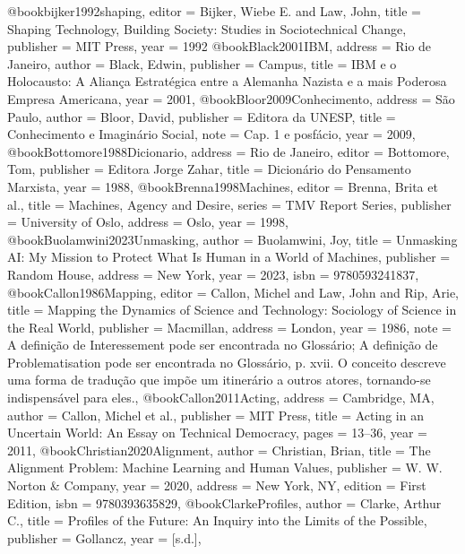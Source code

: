 @book{bijker1992shaping,
  editor    = {Bijker, Wiebe E. and Law, John},
  title     = {Shaping Technology, Building Society: Studies in Sociotechnical Change},
  publisher = {MIT Press},
  year      = {1992}
}
@book{Black2001IBM,
  address   = {Rio de Janeiro},
  author    = {Black, Edwin},
  publisher = {Campus},
  title     = {{IBM e o Holocausto: A Aliança Estratégica entre a Alemanha Nazista e a mais Poderosa Empresa Americana}},
  year      = {2001},
}
@book{Bloor2009Conhecimento,
  address   = {São Paulo},
  author    = {Bloor, David},
  publisher = {Editora da UNESP},
  title     = {{Conhecimento e Imaginário Social}},
  note      = {Cap. 1 e posfácio},
  year      = {2009},
}
@book{Bottomore1988Dicionario,
  address   = {Rio de Janeiro},
  editor    = {Bottomore, Tom},
  publisher = {Editora Jorge Zahar},
  title     = {{Dicionário do Pensamento Marxista}},
  year      = {1988},
}
@book{Brenna1998Machines,
  editor    = {Brenna, Brita et al.},
  title     = {{Machines, Agency and Desire}},
  series    = {{TMV Report Series}},
  publisher = {University of Oslo},
  address   = {Oslo},
  year      = {1998},
}
@book{Buolamwini2023Unmasking,
  author    = {Buolamwini, Joy},
  title     = {{Unmasking AI: My Mission to Protect What Is Human in a World of Machines}},
  publisher = {Random House},
  address   = {New York},
  year      = {2023},
  isbn      = {9780593241837},
}
@book{Callon1986Mapping,
  editor    = {Callon, Michel and Law, John and Rip, Arie},
  title     = {{Mapping the Dynamics of Science and Technology: Sociology of Science in the Real World}},
  publisher = {Macmillan},
  address   = {London},
  year      = {1986},
  note      = {A definição de Interessement pode ser encontrada no Glossário; A definição de Problematisation pode ser encontrada no Glossário, p. xvii. O conceito descreve uma forma de tradução que impõe um itinerário a outros atores, tornando-se indispensável para eles.},
}
@book{Callon2011Acting,
  address   = {Cambridge, MA},
  author    = {Callon, Michel et al.},
  publisher = {MIT Press},
  title     = {{Acting in an Uncertain World: An Essay on Technical Democracy}},
  pages     = {13--36},
  year      = {2011},
}
@book{Christian2020Alignment,
  author    = {Christian, Brian},
  title     = {{The Alignment Problem: Machine Learning and Human Values}},
  publisher = {W. W. Norton \& Company},
  year      = {2020},
  address   = {New York, NY},
  edition   = {First Edition},
  isbn      = {9780393635829},
}
@book{ClarkeProfiles,
  author    = {Clarke, Arthur C.},
  title     = {{Profiles of the Future: An Inquiry into the Limits of the Possible}},
  publisher = {Gollancz},
  year      = {[s.d.]},
}

